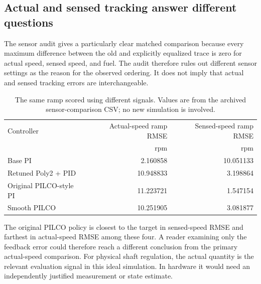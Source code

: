 \subsection{Actual and sensed tracking answer different questions}
The sensor audit gives a particularly clear matched comparison because every maximum difference between the old and explicitly equalized trace is zero for actual speed, sensed speed, and fuel. The audit therefore rules out different sensor settings as the reason for the observed ordering. It does not imply that actual and sensed tracking errors are interchangeable.
\begin{table}[htbp]\centering\small
\begin{tabular}{lrr}\toprule Controller & Actual-speed ramp RMSE & Sensed-speed ramp RMSE\\ & rpm & rpm\\\midrule
Base PI & 2.160858 & 10.051133\\
Retuned Poly2 + PID & 10.948833 & 3.198864\\
Original PILCO-style PI & 11.223721 & 1.547154\\
Smooth PILCO & 10.251905 & 3.081877\\\bottomrule
\end{tabular}\caption{The same ramp scored using different signals. Values are from the archived sensor-comparison CSV; no new simulation is involved.}\end{table}
The original PILCO policy is closest to the target in sensed-speed RMSE and farthest in actual-speed RMSE among these four. A reader examining only the feedback error could therefore reach a different conclusion from the primary actual-speed comparison. For physical shaft regulation, the actual quantity is the relevant evaluation signal in this ideal simulation. In hardware it would need an independently justified measurement or state estimate.

